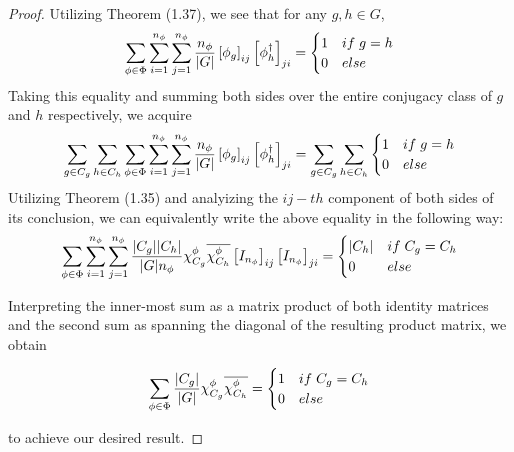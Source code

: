 \noindent \begin{proof}\cite{Tung}  Utilizing Theorem (1.37), we see that for any $g, h \in G$, $$\sum_{\phi \in \Phi} \sum_{i=1}^{n_\phi} \sum_{j=1}^{n_\phi} \frac{n_\phi}{|G|} \left[\phi_g\right]_{ij}\left[\phi_{h}^\dag\right]_{ji} = \begin{cases}
																										1 & if \hspace{1mm} g = h \\
																										0 & else
																									\end{cases}$$
Taking this equality and summing both sides over the entire conjugacy class of $g$ and $h$ respectively, we acquire
\begin{equation}
	\begin{aligned}
		\sum_{g \in C_g} \sum_{h\in C_h} \sum_{\phi \in \Phi} \sum_{i=1}^{n_\phi} \sum_{j=1}^{n_\phi} \frac{n_\phi}{|G|} \left[\phi_g\right]_{ij}\left[\phi_{h}^\dag\right]_{ji} = \sum_{g \in C_g} \sum_{h\in C_h} \begin{cases}
																										1 & if \hspace{1mm} g = h \\
																										0 & else
																									\end{cases}
	\end{aligned}
\end{equation}
Utilizing Theorem (1.35) and analyizing the $ij-th$ component of both sides of its conclusion, we can equivalently write the above equality in the following way:
\begin{equation}
	\begin{aligned}
		 \sum_{\phi \in \Phi} \sum_{i=1}^{n_\phi} \sum_{j=1}^{n_\phi} \frac{|C_g||C_h|}{|G|n_\phi}\chi^\phi_{C_g}\overline{\chi^\phi_{C_h}} \left[I_{n_\phi}\right]_{ij}\left[I_{n_\phi}\right]_{ji} = \begin{cases}
																										|C_h| & if \hspace{1mm} C_g = C_h \\
																										0 & else
																									\end{cases}
	\end{aligned}
\end{equation}

Interpreting the inner-most sum as a matrix product of both identity matrices and the second sum as spanning the diagonal of the resulting product matrix, we obtain

\begin{equation}
	\begin{aligned}
		 \sum_{\phi \in \Phi} \frac{|C_g|}{|G|}\chi^\phi_{C_g}\overline{\chi^\phi_{C_h}} = \begin{cases}
																										1 & if \hspace{1mm} C_g = C_h \\
																										0 & else
																									\end{cases}
	\end{aligned}
\end{equation}

to achieve our desired result.  \end{proof}


